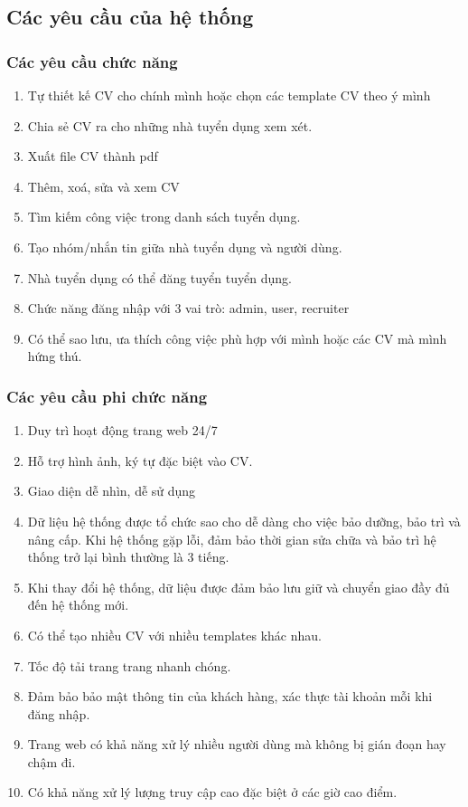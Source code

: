\subsection{Các yêu cầu của hệ thống}

\subsubsection{Các yêu cầu chức năng}

\begin{enumerate}
    \item Tự thiết kế CV cho chính mình hoặc chọn các template CV theo ý mình
    \item Chia sẻ CV ra cho những nhà tuyển dụng xem xét.
    \item Xuất file CV thành pdf
    \item Thêm, xoá, sửa và xem CV
    \item Tìm kiếm công việc trong danh sách tuyển dụng.
    \item Tạo nhóm/nhắn tin giữa nhà tuyển dụng và người dùng.
    \item Nhà tuyển dụng có thể đăng tuyển tuyển dụng.
    \item Chức năng đăng nhập với 3 vai trò: admin, user, recruiter
    \item Có thể sao lưu, ưa thích công việc phù hợp với mình hoặc các CV mà mình hứng thú.
\end{enumerate}
 

\subsubsection{Các yêu cầu phi chức năng}


\begin{enumerate}
    \item Duy trì hoạt động trang web 24/7
    \item Hỗ trợ hình ảnh, ký tự đặc biệt vào CV.
    \item Giao diện dễ nhìn, dễ sử dụng
    \item Dữ liệu hệ thống được tổ chức sao cho dễ dàng cho việc bảo dưỡng, bảo trì và nâng cấp. Khi hệ thống gặp lỗi, đảm bảo thời gian sửa chữa và bảo trì hệ thống trở lại bình thường là 3 tiếng.
    \item Khi thay đổi hệ thống, dữ liệu được đảm bảo lưu giữ và chuyển giao đầy đủ đến hệ thống mới.
    \item Có thể tạo nhiều CV với nhiều templates khác nhau.
    \item Tốc độ tải trang trang nhanh chóng.
    \item Đảm bảo bảo mật thông tin của khách hàng, xác thực tài khoản mỗi khi đăng nhập.
    \item Trang web có khả năng xử lý nhiều người dùng mà không bị gián đoạn hay chậm đi.
    \item Có khả năng xử lý lượng truy cập cao đặc biệt ở các giờ cao điểm.
\end{enumerate}

